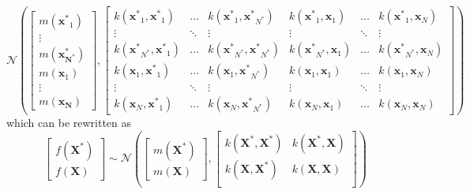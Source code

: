 {\small\begingroup
\renewcommand{\arraystretch}{1.25}
\setlength\arraycolsep{0.5pt}
\begin{equation}\label{GPJointBig}
    \mathcal{N}\left(\left[\begin{array}{c}
        m\left(\mathbf{x^*}_{1}\right)\\
        \vdots \\
        m\left(\mathbf{x^*_{N^*}}\right)\\
        m\left(\mathbf{x}_{1}\right)\\
        \vdots \\
        m\left(\mathbf{x_{N}}\right)
        \end{array}\right],
        \left[
        \begin{array}{cccccc}
        k\left(\mathbf{x^*}_{1}, \mathbf{x^*}_{1}\right) & \ldots & k\left(\mathbf{x^*}_{1}, \mathbf{x^*}_{N^*}\right) & k\left(\mathbf{x^*}_{1}, \mathbf{x}_{1}\right) & \ldots & k\left(\mathbf{x^*}_{1}, \mathbf{x}_{N}\right) \\
         \vdots & \ddots & \vdots & \vdots & \ddots & \vdots \\
        k\left(\mathbf{x^*}_{N^*}, \mathbf{x^*}_{1}\right) & \ldots & k\left(\mathbf{x^*}_{N^*}, \mathbf{x^*}_{N^*}\right) & k\left(\mathbf{x^*}_{N^*}, \mathbf{x}_{1}\right) & \ldots & k\left(\mathbf{x^*}_{N^*}, \mathbf{x}_{N}\right) \\
        k\left(\mathbf{x}_{1}, \mathbf{x^*}_{1}\right) & \ldots & k\left(\mathbf{x}_{1}, \mathbf{x^*}_{N^*}\right) & k\left(\mathbf{x}_{1}, \mathbf{x}_{1}\right) & \ldots & k\left(\mathbf{x}_{1}, \mathbf{x}_{N}\right) \\
        \vdots & \ddots & \vdots & \vdots & \ddots & \vdots \\
        k\left(\mathbf{x}_{N}, \mathbf{x^*}_{1}\right) & \ldots & k\left(\mathbf{x}_{N}, \mathbf{x^*}_{N^*}\right) & k\left(\mathbf{x}_{N}, \mathbf{x}_{1}\right) & \ldots & k\left(\mathbf{x}_{N}, \mathbf{x}_{N}\right)
        \end{array}
        \right]\right)
\end{equation}
\endgroup
}
which can be rewritten as
\begin{equation}\label{GPJointConcise}
        \left[\begin{array}{l}
        f\left(\mathbf{X^*}\right)\\
        f\left(\mathbf{X}\right)
    \end{array}\right] \sim \mathcal{N}\left(\left[\begin{array}{c}
        m\left(\mathbf{X^*}\right)\\
        m\left(\mathbf{X}\right)
        \end{array}\right],
        \left[\begin{array}{cc}
        k\left(\mathbf{X^*}, \mathbf{X^*}\right) & k\left(\mathbf{X^*}, \mathbf{X}\right) \\
        k\left(\mathbf{X}, \mathbf{X^*}\right) & k\left(\mathbf{X}, \mathbf{X}\right) \\
        \end{array}\right]\right)
\end{equation}
